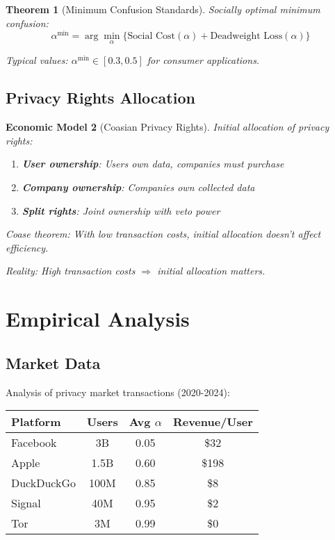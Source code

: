 \documentclass[11pt,final]{article}
\newtheorem{theorem}{Theorem}[section]
\newtheorem{model}[theorem]{Economic Model}
\begin{document}
\begin{theorem}[Minimum Confusion Standards]
Socially optimal minimum confusion:
\begin{equation}
\alpha^{\min} = \arg\min_\alpha \{\text{Social Cost}(\alpha) + \text{Deadweight Loss}(\alpha)\}
\end{equation}

Typical values: $\alpha^{\min} \in [0.3, 0.5]$ for consumer applications.
\end{theorem}

\subsection{Privacy Rights Allocation}

\begin{model}[Coasian Privacy Rights]
Initial allocation of privacy rights:
\begin{enumerate}
    \item \textbf{User ownership}: Users own data, companies must purchase
    \item \textbf{Company ownership}: Companies own collected data
    \item \textbf{Split rights}: Joint ownership with veto power
\end{enumerate}

Coase theorem: With low transaction costs, initial allocation doesn't affect efficiency.

Reality: High transaction costs $\Rightarrow$ initial allocation matters.
\end{model}

\section{Empirical Analysis}

\subsection{Market Data}

Analysis of privacy market transactions (2020-2024):

\begin{center}
\begin{tabular}{lccc}
\toprule
\textbf{Platform} & \textbf{Users} & \textbf{Avg $\alpha$} & \textbf{Revenue/User} \\
\midrule
Facebook & 3B & 0.05 & \$32 \\
Apple & 1.5B & 0.60 & \$198 \\
DuckDuckGo & 100M & 0.85 & \$8 \\
Signal & 40M & 0.95 & \$2 \\
Tor & 3M & 0.99 & \$0 \\
\bottomrule
\end{tabular}
\end{center}
\end{document}

